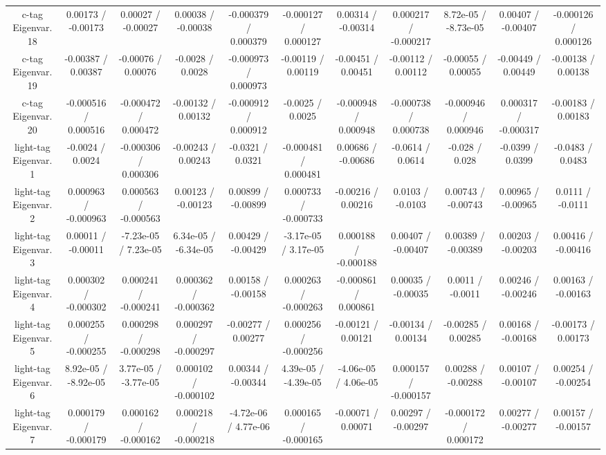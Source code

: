 \begin{table}[htbp]
\begin{center}
\begin{tabular}{|c|c|c|c|c|c|c|c|c|c|c|}
  c-tag Eigenvar. 18 & 0.00173 / -0.00173 & 0.00027 / -0.00027 & 0.00038 / -0.00038 & -0.000379 / 0.000379 & -0.000127 / 0.000127 & 0.00314 / -0.00314 & 0.000217 / -0.000217 & 8.72e-05 / -8.73e-05 & 0.00407 / -0.00407 & -0.000126 / 0.000126 \\ 
  c-tag Eigenvar. 19 & -0.00387 / 0.00387 & -0.00076 / 0.00076 & -0.0028 / 0.0028 & -0.000973 / 0.000973 & -0.00119 / 0.00119 & -0.00451 / 0.00451 & -0.00112 / 0.00112 & -0.00055 / 0.00055 & -0.00449 / 0.00449 & -0.00138 / 0.00138 \\ 
  c-tag Eigenvar. 20 & -0.000516 / 0.000516 & -0.000472 / 0.000472 & -0.00132 / 0.00132 & -0.000912 / 0.000912 & -0.0025 / 0.0025 & -0.000948 / 0.000948 & -0.000738 / 0.000738 & -0.000946 / 0.000946 & 0.000317 / -0.000317 & -0.00183 / 0.00183 \\ 
  light-tag Eigenvar. 1 & -0.0024 / 0.0024 & -0.000306 / 0.000306 & -0.00243 / 0.00243 & -0.0321 / 0.0321 & -0.000481 / 0.000481 & 0.00686 / -0.00686 & -0.0614 / 0.0614 & -0.028 / 0.028 & -0.0399 / 0.0399 & -0.0483 / 0.0483 \\ 
  light-tag Eigenvar. 2 & 0.000963 / -0.000963 & 0.000563 / -0.000563 & 0.00123 / -0.00123 & 0.00899 / -0.00899 & 0.000733 / -0.000733 & -0.00216 / 0.00216 & 0.0103 / -0.0103 & 0.00743 / -0.00743 & 0.00965 / -0.00965 & 0.0111 / -0.0111 \\ 
  light-tag Eigenvar. 3 & 0.00011 / -0.00011 & -7.23e-05 / 7.23e-05 & 6.34e-05 / -6.34e-05 & 0.00429 / -0.00429 & -3.17e-05 / 3.17e-05 & 0.000188 / -0.000188 & 0.00407 / -0.00407 & 0.00389 / -0.00389 & 0.00203 / -0.00203 & 0.00416 / -0.00416 \\ 
  light-tag Eigenvar. 4 & 0.000302 / -0.000302 & 0.000241 / -0.000241 & 0.000362 / -0.000362 & 0.00158 / -0.00158 & 0.000263 / -0.000263 & -0.000861 / 0.000861 & 0.00035 / -0.00035 & 0.0011 / -0.0011 & 0.00246 / -0.00246 & 0.00163 / -0.00163 \\ 
  light-tag Eigenvar. 5 & 0.000255 / -0.000255 & 0.000298 / -0.000298 & 0.000297 / -0.000297 & -0.00277 / 0.00277 & 0.000256 / -0.000256 & -0.00121 / 0.00121 & -0.00134 / 0.00134 & -0.00285 / 0.00285 & 0.00168 / -0.00168 & -0.00173 / 0.00173 \\ 
  light-tag Eigenvar. 6 & 8.92e-05 / -8.92e-05 & 3.77e-05 / -3.77e-05 & 0.000102 / -0.000102 & 0.00344 / -0.00344 & 4.39e-05 / -4.39e-05 & -4.06e-05 / 4.06e-05 & 0.000157 / -0.000157 & 0.00288 / -0.00288 & 0.00107 / -0.00107 & 0.00254 / -0.00254 \\ 
  light-tag Eigenvar. 7 & 0.000179 / -0.000179 & 0.000162 / -0.000162 & 0.000218 / -0.000218 & -4.72e-06 / 4.77e-06 & 0.000165 / -0.000165 & -0.00071 / 0.00071 & 0.00297 / -0.00297 & -0.000172 / 0.000172 & 0.00277 / -0.00277 & 0.00157 / -0.00157 \\ 

\end{tabular}
\end{center}
\end{table}
